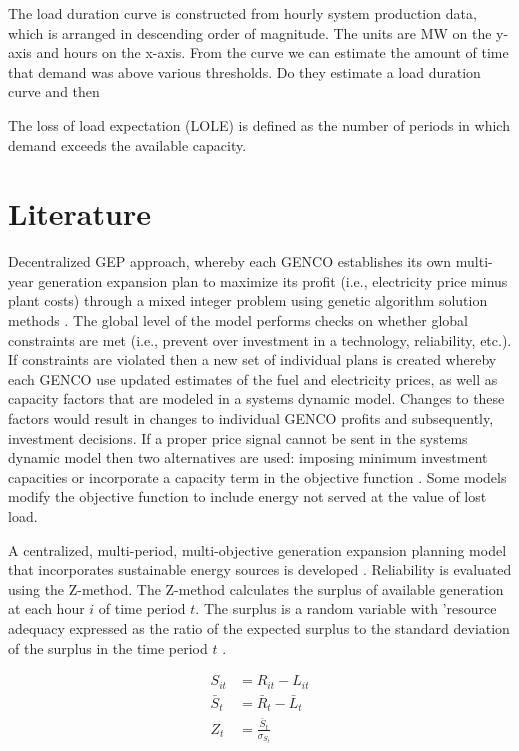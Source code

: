 \documentclass[10pt]{amsart}
\begin{document}
The load duration curve is constructed from hourly system production data, which is arranged in descending order of magnitude. 
The units are MW on the y-axis and hours on the x-axis. 
From the curve we can estimate the amount of time that demand was above various thresholds. 
Do they estimate a load duration curve and then 

The loss of load expectation (LOLE) is defined as the number of periods in which demand exceeds the available capacity.


\section{Literature}
Decentralized GEP approach, whereby each GENCO establishes its own multi-year generation expansion plan to maximize its profit (i.e., electricity price minus plant costs) through a mixed integer problem using genetic algorithm solution methods \parencite{pereira2011generation}. 
The global level of the model performs checks on whether global constraints are met (i.e., prevent over investment in a technology, reliability, etc.). 
If constraints are violated then a new set of individual plans is created whereby each GENCO use updated estimates of the fuel and electricity prices, as well as capacity factors that are modeled in a systems dynamic model. 
Changes to these factors would result in changes to individual GENCO profits and subsequently, investment decisions. 
If a proper price signal cannot be sent in the systems dynamic model then two alternatives are used: imposing minimum investment capacities or incorporate a capacity term in the objective function \parencite{pereira2011generation}. 
Some models modify the objective function to include energy not served at the value of lost load.

A centralized, multi-period, multi-objective generation expansion planning model that incorporates sustainable energy sources is developed \parencite{aghaei:2013aa}.  
Reliability is evaluated using the Z-method.
The Z-method calculates the surplus of available generation at each hour $i$ of time period $t$. 
The surplus is a random variable with 'resource adequacy expressed as the ratio of the expected surplus to the standard deviation of the surplus in the time period $t$ \parencite{aghaei:2013aa}.

\begin{equation}	
\begin{split}
S_{it} &= R_{it} - L_{it} \\
\bar{S}_{t} &= \bar{R}_{t} - \bar{L}_{t} \\
Z_{t} &= \frac{\bar{S}_{t}}{\sigma_{S_t}}
\end{split}
\end{equation} 
\end{document}

